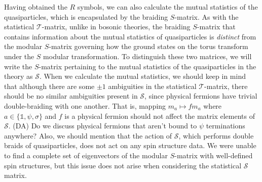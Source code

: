 \documentclass[12pt,a4paper]{article}
\newcommand{\unit}{\mathds{1}}
\newcommand{\mct}{\mathcal{T}}
\newcommand{\mcs}{\mathcal{S}}
\newcommand{\dave}[1]{{\color{ao(english)}\footnotesize{(DA) #1}}}
\begin{document}
Having obtained the $R$ symbols, we can also calculate the mutual statistics of the quasiparticles, which is encapsulated by the braiding $S$-matrix. 
As with the statistical $\mct$-matrix, unlike in bosonic theories, the braiding $S$-matrix that contains information about the mutual statistics of quasiparticles is {\it distinct} from the modular $S$-matrix governing how the ground states on the torus transform under the $S$ modular transformation. 
To distinguish these two matrices, we will write the $S$-matrix pertaining to the mutual statistics of the quasiparticles in the theory as $\mcs$. 
When we calculate the mutual statistics, we should keep in mind that although there are some $\pm1$ ambiguities in the statistical $\mct$-matrix, there should be no similar ambiguities present in $\mcs$, since physical fermions have trivial double-braiding with one another. 
That is, mapping $m_a \mapsto fm_a$ where $a\in \{\unit,\psi,\sigma\}$ and $f$ is a physical fermion should not affect the matrix elements of $\mcs$. 
\dave{Do we discuss physical fermions that aren't bound to $\psi$ terminations anywhere?}
Also, we should mention that the action of $\mcs$, which performs double braids of quasiparticles, does not act on any spin structure data.
We were unable to find a complete set of eigenvectors of the modular $S$-matrix with well-defined spin structures, but this issue does not arise when considering the statistical $\mcs$ matrix.  
\end{document}
